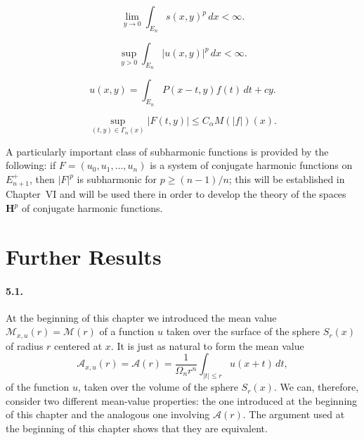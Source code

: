 \begin{equation}\label{eq:c2-4-9}
\lim_{y \to 0} \int_{E_n} s(x, y)^p\,dx < \infty.
\end{equation}

\begin{equation}\label{eq:c2-4-10}
\sup_{y > 0} \int_{E_n} |u(x, y)|^p\,dx < \infty.
\end{equation}

\begin{equation}\label{eq:c2-4-11}
u(x, y) = \int_{E_n} P(x - t, y) f(t)\,dt + c y.
\end{equation}

\begin{equation}\label{eq:c2-4-12}
\sup_{(t,y) \in \Gamma_\alpha(x)} |F(t, y)| \leq C_\alpha M(|f|)(x).
\end{equation}

A particularly important class of subharmonic functions is provided by the following: if $F = (u_0, u_1, \dots, u_n)$ is a system of conjugate harmonic functions on $E_{n+1}^+$, then $|F|^p$ is subharmonic for $p \geq (n-1)/n$; this will be established in Chapter~VI and will be used there in order to develop the theory of the spaces $\mathbf{H}^p$ of conjugate harmonic functions.

\section{Further Results}

\paragraph{5.1.} At the beginning of this chapter we introduced the mean value $\mathcal{M}_{x,u}(r) = \mathcal{M}(r)$ of a function $u$ taken over the surface of the sphere $S_r(x)$ of radius $r$ centered at $x$. It is just as natural to form the mean value
\[
\mathcal{A}_{x,u}(r) = \mathcal{A}(r) = \frac{1}{\Omega_n r^n} \int_{|t| \leq r} u(x + t)\,dt,
\]
of the function $u$, taken over the volume of the sphere $S_r(x)$. We can, therefore, consider two different mean-value properties: the one introduced at the beginning of this chapter and the analogous one involving $\mathcal{A}(r)$. The argument used at the beginning of this chapter shows that they are equivalent.

